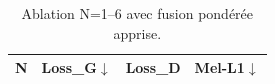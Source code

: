 
\begin{table}[ht]
\centering
\begin{tabular}{lccc}
\toprule
\textbf{N} & \textbf{Loss\_G}$\downarrow$ & \textbf{Loss\_D} & \textbf{Mel-L1}$\downarrow$ \\
\midrule
\bottomrule
\end{tabular}
\caption{Ablation N=1--6 avec fusion pondérée apprise.}
\label{tab:ablation_weighted}
\end{table}

